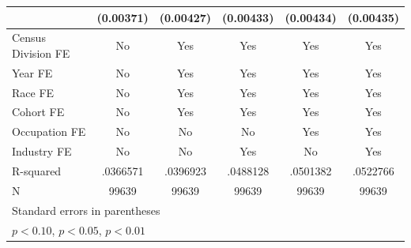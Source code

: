 {\begin{tabular}{l*{5}{c}}
                    &   (0.00371)         &   (0.00427)         &   (0.00433)         &   (0.00434)         &   (0.00435)         \\
\hline
Census Division FE  &          No         &         Yes         &         Yes         &         Yes         &         Yes         \\
Year FE             &          No         &         Yes         &         Yes         &         Yes         &         Yes         \\
Race FE             &          No         &         Yes         &         Yes         &         Yes         &         Yes         \\
Cohort FE           &          No         &         Yes         &         Yes         &         Yes         &         Yes         \\
Occupation FE       &          No         &          No         &          No         &         Yes         &         Yes         \\
Industry FE         &          No         &          No         &         Yes         &          No         &         Yes         \\
R-squared           &    .0366571         &    .0396923         &    .0488128         &    .0501382         &    .0522766         \\
N                   &       99639         &       99639         &       99639         &       99639         &       99639         \\
\hline\hline
\multicolumn{6}{l}{\footnotesize Standard errors in parentheses}\\
\multicolumn{6}{l}{\footnotesize \sym{*} \(p<0.10\), \sym{**} \(p<0.05\), \sym{***} \(p<0.01\)}\\
\end{tabular}
}
